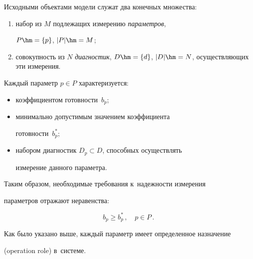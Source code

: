  


Исходными объектами модели служат два конечных множества:


\begin{enumerate}[(1)]


\item набор из $M$ подлежащих измерению \textit{па\-ра\-мет\-ров}, 


$P\hm= \{p\}$, $\vert P\vert \hm= M$; 


\item совокупность из $N$ \textit{диагностик}, $D\hm= \{d\}$, $\vert 


D\vert \hm= N$, осу\-щест\-в\-ля\-ющих эти измерения.


\end{enumerate}





Каждый параметр $p\in P$ характеризуется:


\begin{itemize}


\item коэффициентом готовности~$b_p$;


\item минимально допустимым значением коэффициента 


го\-тов\-ности~$b_p^*$;


\item набором диагностик $D_p\subset D$, способных осуществлять 


измерение данного па\-ра\-метра.


\end{itemize}





Таким образом, необходимые требования к~на\-деж\-ности измерения 


па\-ра\-мет\-ров отражают неравенства:


\begin{equation}


b_p \geq b_p^*\,,\quad p\in P\,.


\label{e1-kn}


\end{equation}





Как было указано выше, каждый параметр имеет определенное назначение 


(operation role) в~сис\-теме. 





